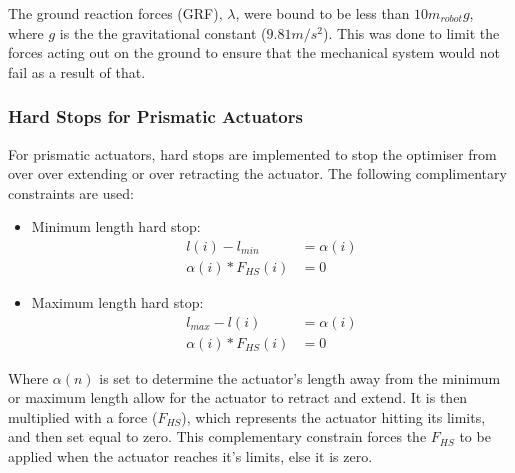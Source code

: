         The ground reaction forces (GRF), $\lambda$, were bound to be less than $10m_{robot}g$, where $g$ is the the gravitational constant ($9.81 m/s^2$). This was done to limit the forces acting out on the ground to ensure that the mechanical system would not fail as a result of that.
    
        \subsubsection{Hard Stops for Prismatic Actuators} \label{Hard Stops}
        For prismatic actuators, hard stops are implemented to stop the optimiser from over over extending or over retracting the actuator. The following complimentary constraints are used:
        
        \begin{itemize}
            \item Minimum length hard stop:
            \begin{equation}
                \begin{split}
                    l(i) - l_{min} &= \alpha(i) \\
                    \alpha(i)*F_{HS}(i) &= 0                     
                \end{split}
            \end{equation}
            \item Maximum length hard stop:
            \begin{equation}
                \begin{split}
                    l_{max} - l(i) &= \alpha(i) \\
                    \alpha(i)*F_{HS}(i) &= 0                     
                \end{split}
            \end{equation}          
        \end{itemize}
        
        Where $\alpha(n)$ is set to determine the actuator's length away from the minimum or maximum length allow for the actuator to retract and extend. It is then multiplied with a force ($F_{HS}$), which represents the actuator hitting its limits, and then set equal to zero. This complementary constrain forces the $F_{HS}$ to be applied when the actuator reaches it's limits, else it is zero.
        
